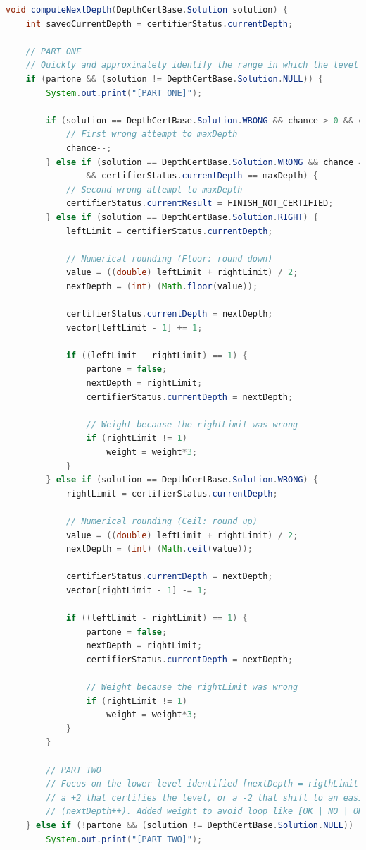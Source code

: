 \documentclass[
	corpo=12pt,
	twoside,
 	evenboxes,
	tipotesi=triennale,
    	stile=classica,
   	 greek,
]{toptesi}
\begin{document}
\begin{lstlisting}[language=Java, label=lst:computenextdepth, caption={Metodo computeNextDepth}]
void computeNextDepth(DepthCertBase.Solution solution) {
	int savedCurrentDepth = certifierStatus.currentDepth;

	// PART ONE
	// Quickly and approximately identify the range in which the level can be contained
	if (partone && (solution != DepthCertBase.Solution.NULL)) {
		System.out.print("[PART ONE]");

		if (solution == DepthCertBase.Solution.WRONG && chance > 0 && certifierStatus.currentDepth == maxDepth) {
			// First wrong attempt to maxDepth
			chance--;
		} else if (solution == DepthCertBase.Solution.WRONG && chance == 0
				&& certifierStatus.currentDepth == maxDepth) {
			// Second wrong attempt to maxDepth
			certifierStatus.currentResult = FINISH_NOT_CERTIFIED;
		} else if (solution == DepthCertBase.Solution.RIGHT) {
			leftLimit = certifierStatus.currentDepth;

			// Numerical rounding (Floor: round down)
			value = ((double) leftLimit + rightLimit) / 2;
			nextDepth = (int) (Math.floor(value));

			certifierStatus.currentDepth = nextDepth;
			vector[leftLimit - 1] += 1;

			if ((leftLimit - rightLimit) == 1) {
				partone = false;
				nextDepth = rightLimit;
				certifierStatus.currentDepth = nextDepth;
				
				// Weight because the rightLimit was wrong
				if (rightLimit != 1)
					weight = weight*3;
			}
		} else if (solution == DepthCertBase.Solution.WRONG) {
			rightLimit = certifierStatus.currentDepth;

			// Numerical rounding (Ceil: round up)
			value = ((double) leftLimit + rightLimit) / 2;
			nextDepth = (int) (Math.ceil(value));

			certifierStatus.currentDepth = nextDepth;
			vector[rightLimit - 1] -= 1;

			if ((leftLimit - rightLimit) == 1) {
				partone = false;
				nextDepth = rightLimit;
				certifierStatus.currentDepth = nextDepth;
				
				// Weight because the rightLimit was wrong
				if (rightLimit != 1)
					weight = weight*3;
			}
		}
		
		// PART TWO
		// Focus on the lower level identified [nextDepth = rigthLimit] until it reaches
		// a +2 that certifies the level, or a -2 that shift to an easier level
		// (nextDepth++). Added weight to avoid loop like [OK | NO | OK | NO]
	} else if (!partone && (solution != DepthCertBase.Solution.NULL)) {
		System.out.print("[PART TWO]");


\end{lstlisting}
\end{document}
